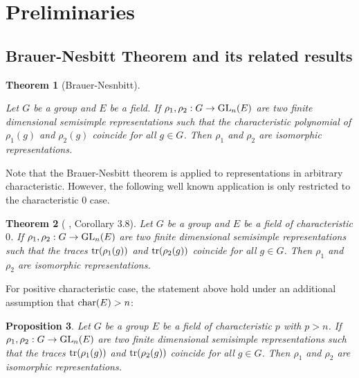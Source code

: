 \documentclass[20pt, oneside]{article}   	%
\newtheorem{thm}{Theorem}[section]
\newtheorem{prop}[thm]{Proposition}
\theoremstyle{definition}
\begin{document}
\section{Preliminaries}

\subsection{Brauer-Nesbitt Theorem and its related results}


\begin{thm}[Brauer-Nesnbitt]\label{BN}

Let $G$ be a group and $E$ be a field. If $\rho_1, \rho_2: G\rightarrow {\rm GL}_n(E)$ are two finite dimensional semisimple representations such that the characteristic polynomial of $\rho_1(g)$ and $\rho_2(g)$ coincide for all $g\in G$. Then $\rho_1$ and $\rho_2$ are isomorphic representations. 

\end{thm}



Note that the Brauer-Nesbitt theorem is applied to representations in arbitrary characteristic. However, the following well known application is only restricted to the characteristic $0$ case.

\begin{thm}[ \cite{Lan84}, Corollary 3.8]\label{0case}
Let $G$ be a group and $E$ be a field of characteristic $0$. If $\rho_1, \rho_2: G\rightarrow {\rm GL}_n(E)$ are two finite dimensional semisimple representations such that the traces ${\rm tr}(\rho_1(g))$ and ${\rm tr}(\rho_2(g))$ coincide for all $g\in G$. Then $\rho_1$ and $\rho_2$ are isomorphic representations. 

\end{thm}
For positive characteristic case, the statement above hold under an additional assumption that ${\rm char}(E)>n$:

\begin{prop}\label{pcase}
Let $G$ be a group $E$ be a field of characteristic $p$ with $p>n$. If $\rho_1, \rho_2: G\rightarrow {\rm GL}_n(E)$ are two finite dimensional semisimple representations such that the traces ${\rm tr}(\rho_1(g))$ and ${\rm tr}(\rho_2(g))$ coincide for all $g\in G$. Then $\rho_1$ and $\rho_2$ are isomorphic representations. \end{prop}
\end{document}
